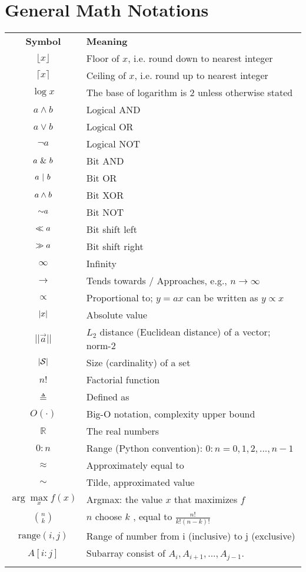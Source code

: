 \label{sec:Notation}

\section*{General Math Notations}

\begin{longtable}{cl}
\hline\noalign{\smallskip}
\textbf{Symbol} & \textbf{Meaning} \\
\noalign{\smallskip}\hline\noalign{\smallskip}
$\lfloor x \rfloor$ & Floor of $x$, i.e. round down to nearest integer\\
$\lceil x \rceil$ & Ceiling of $x$, i.e. round up to nearest integer\\
$\log x$ & The base of logarithm is 2 unless otherwise stated\\
$a \wedge b$ & Logical AND\\
$a \vee b$ & Logical OR\\
$\neg a $ & Logical NOT\\
$a\ \&\  b$ & Bit AND\\
$a \ |\  b$ & Bit OR\\
$a \wedge  b$ & Bit XOR\\
$\mathord{\sim} a$ & Bit NOT\\
$\ll a$ & Bit shift left\\
$\gg a$ & Bit shift right\\
$\infty$ & Infinity\\
$\rightarrow$ & Tends towards / Approaches, e.g., $n \rightarrow \infty$\\
$\propto$ &Proportional to; $y = ax$ can be written as $y \propto x$\\
$\left\lvert x\right\rvert$ & Absolute value\\
$||\vec{a}||$ & $L_2$ distance (Euclidean distance) of a vector; norm-2 \\
$\left\lvert\mathcal{S}\right\rvert$ & Size (cardinality) of a set\\
$n!$ & Factorial function\\
$\triangleq$ & Defined as\\
$O(\cdot)$ & Big-O notation, complexity upper bound\\
$\mathbb{R}$ & The real numbers\\
$0:n$ & Range (Python convention): $0:n = {0, 1, 2,...,n-1}$\\
$\approx$ & Approximately equal to\\
$\sim$ & Tilde, approximated value \\
$\arg\max\limits_x f(x)$ & Argmax: the value $x$ that maximizes $f$\\
$\binom{n}{k}$ & $n$ choose $k$ , equal to $\frac{n!}{k!(n-k)!}$\\
$\text{range}(i,j)$ & Range of number from i (inclusive) to j (exclusive) \\
$A[i:j]$ & Subarray consist of $A_i, A_{i+1}, ..., A_{j-1}$.\\
\noalign{\smallskip}\hline\noalign{\smallskip}
\end{longtable}


\twocolumn
